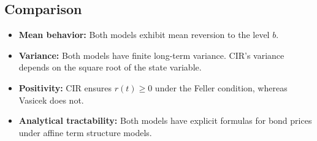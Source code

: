 \subsection{Comparison}

\begin{itemize}
    \item \textbf{Mean behavior:} Both models exhibit mean reversion to the level \( b \).
    \item \textbf{Variance:} Both models have finite long-term variance. CIR's variance depends on the square root of the state variable.
    \item \textbf{Positivity:} CIR ensures \( r(t) \geq 0 \) under the Feller condition, whereas Vasicek does not.
    \item \textbf{Analytical tractability:} Both models have explicit formulas for bond prices under affine term structure models.
\end{itemize}